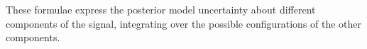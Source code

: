 
These formulae express the posterior model uncertainty about different components of the signal, integrating over the possible configurations of the other components.





\outbpdocument{


}


